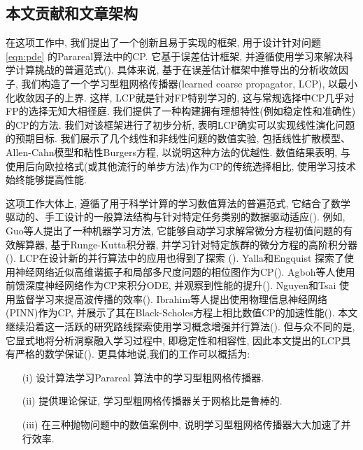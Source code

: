 \subsection{本文贡献和文章架构}
在这项工作中, 我们提出了一个创新且易于实现的框架, 用于设计针对问题 \eqref{eqn:pde} 的Parareal算法中的CP. 它基于误差估计框架, 并遵循使用学习来解决科学计算挑战的普遍范式(\cite{FriedhoffSouthworth:2021,GanderVandewalle:2007,Southworth:2019,yang2021robust}). 具体来说, 基于在误差估计框架中推导出的分析收敛因子, 我们构造了一个学习型粗网格传播器(learned coarse propagator, LCP), 以最小化收敛因子的上界. 这样, LCP就是针对FP特别学习的, 这与常规选择中CP几乎对FP的选择无知大相径庭. 我们提供了一种构建拥有理想特性(例如稳定性和准确性)的CP的方法. 我们对该框架进行了初步分析, 表明LCP确实可以实现线性演化问题的预期目标. 我们展示了几个线性和非线性问题的数值实验, 包括线性扩散模型、Allen-Cahn模型和粘性Burgers方程, 以说明这种方法的优越性. 数值结果表明, 与使用后向欧拉格式(或其他流行的单步方法)作为CP的传统选择相比, 使用学习技术始终能够提高性能. 


这项工作大体上, 遵循了用于科学计算的学习数值算法的普遍范式, 它结合了数学驱动的、手工设计的一般算法结构与针对特定任务类别的数据驱动适应(\cite{Bar-Sina:2019,GreenfeldKimmel:2019,GuoLi:2022,HuangLiXi:2023,IbrahimRuprecht:2023,Mishra:2019}). 例如, Guo等人提出了一种机器学习方法, 它能够自动学习求解常微分方程初值问题的有效解算器, 基于Runge-Kutta积分器, 并学习针对特定族群的微分方程的高阶积分器(\cite{GuoLi:2022}). LCP在设计新的并行算法中的应用也得到了探索 (\cite{AgbohDogar:2020,IbrahimRuprecht:2023,NguyenTsai:2023,YallaEngquist:2018}). Yalla和Engquist 探索了使用神经网络近似高维谐振子和局部多尺度问题的相位图作为CP(\cite{YallaEngquist:2018}). Agboh等人使用前馈深度神经网络作为CP来积分ODE, 并观察到性能的提升(\cite{AgbohDogar:2020}). Nguyen和Tsai 使用监督学习来提高波传播的效率(\cite{NguyenTsai:2023}). Ibrahim等人提出使用物理信息神经网络(PINN)作为CP, 并展示了其在Black-Scholes方程上相比数值CP的加速性能(\cite{IbrahimRuprecht:2023}). 本文继续沿着这一活跃的研究路线探索使用学习概念增强并行算法(\cite{AgbohDogar:2020,IbrahimRuprecht:2023,NguyenTsai:2023,YallaEngquist:2018}). 但与众不同的是, 它显式地将分析洞察融入学习过程中, 即稳定性和相容性, 因此本文提出的LCP具有严格的数学保证(\cite{jin2023learning}). 更具体地说,我们的工作可以概括为:
\begin{itemize}
	\item[(i)]  设计算法学习Parareal 算法中的学习型粗网格传播器. 
	\item[(ii)]  提供理论保证, 学习型粗网格传播器关于网格比是鲁棒的. 
	\item[(iii)] 在三种抛物问题中的数值案例中, 说明学习型粗网格传播器大大加速了并行效率. 
\end{itemize}



